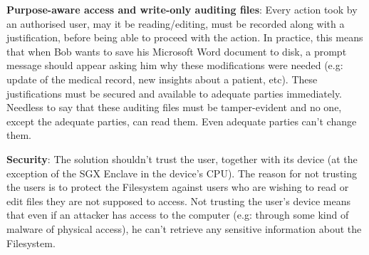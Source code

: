 \documentclass[../main.tex]{subfiles}
\begin{document}
\par \textbf{Purpose-aware access and write-only auditing files}: Every action took by an authorised user, may it be reading/editing, must be recorded along with a justification, before being able to proceed with the action. In practice, this means that when Bob wants to save his Microsoft Word document to disk, a prompt message should appear asking him why these modifications were needed (e.g: update of the medical record, new insights about a patient, etc). These justifications must be secured and available to adequate parties immediately. Needless to say that these auditing files must be tamper-evident and no one, except the adequate parties, can read them. Even adequate parties can't change them.
\par \textbf{Security}: The solution shouldn't trust the user, together with its device (at the exception of the SGX Enclave in the device's CPU). The reason for not trusting the users is to protect the Filesystem against users who are wishing to read or edit files they are not supposed to access. Not trusting the user's device means that even if an attacker has access to the computer (e.g: through some kind of malware of physical access), he can't retrieve any sensitive information about the Filesystem.
\end{document}
